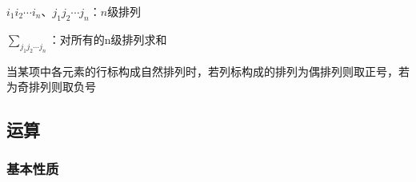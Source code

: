 \documentclass[12pt]{book}
\begin{document}
\par $i_1 i_2\cdots i_n$、$j_1 j_2\cdots j_n$：$n$级排列
\par $\sum_{j_1 j_2\cdots j_n}$：对所有的n级排列求和

当某项中各元素的行标构成自然排列时，若列标构成的排列为偶排列则取正号，若为奇排列则取负号


\subsection{运算}





\subsubsection{基本性质}
\end{document}

